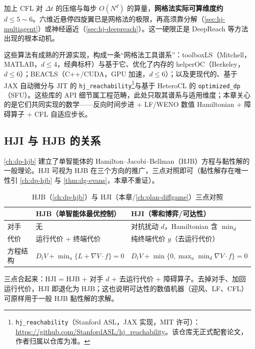\noindent{}加上 CFL 对 $\Delta t$ 的压缩与每步 $O(N^d)$ 的算量，\textbf{网格法实际可算维度约 $d\le5\sim6$}。六维近悬停四旋翼已是网格法的极限，再高须靠分解（\cref{sec:hj-multiagent}）或神经逼近（\cref{sec:hj-deepreach}）。这一硬限正是 DeepReach 等方法出现的根本动机。

这些算法有成熟的开源实现，构成一条“网格法工具谱系”：toolboxLS（Mitchell，MATLAB，$d\le4$，经典标杆）与基于它、优化了内存的 helperOC（Berkeley，$d\le6$）；BEACLS（C++/CUDA，GPU 加速，$d\le6$）；以及更现代的、基于 JAX 自动微分与 JIT 的 \texttt{hj\_reachability}\footnote{\texttt{hj\_reachability}（Stanford ASL，JAX 实现，MIT 许可）：\url{https://github.com/StanfordASL/hj_reachability}。该仓库无正式配套论文，作者归属以仓库为准。}与基于 HeteroCL 的 \texttt{optimized\_dp}（SFU）。这些库的 API 细节属工程范畴，此处只取其谱系与适用维度；本章关心的是它们共同实现的数学——反向时间步进 + LF/WENO 数值 Hamiltonian + 障碍算子 + CFL 自适应步长。

\subsection{HJI 与 HJB 的关系}
\label{sec:hj-vs-hjb}

\cref{ch:dp-hjb} 建立了单智能体的 Hamilton--Jacobi--Bellman（HJB）方程与黏性解的一般理论。HJI 可视为 HJB 在三个方向的推广，三点对照即可（黏性解存在唯一性引 \cref{ch:dp-hjb} 与 \cref{thm:dg-evans}，本章不重证）。

\begin{table}[H]\centering\small
\caption{HJB（\cref{ch:dp-hjb}）与 HJI（本章/\cref{ch:plan-diffgame}）三点对照}
\label{tab:hj-hjb-hji}
\begin{tabular}{lll}
\toprule
 & HJB（单智能体最优控制） & HJI（零和博弈/可达性） \\
\midrule
对手 & 无 & 对抗扰动 $d$，Hamiltonian 含 $\min_d$ \\
代价 & 运行代价 + 终端代价 & 纯终端代价 $g$（去运行代价） \\
方程结构 & $D_tV+\min_u\{L+\nabla V\cdot f\}=0$ & $D_tV+\min\{0,\max_u\min_d\nabla V\cdot f\}=0$ \\
\bottomrule
\end{tabular}
\end{table}

\noindent{}三点合起来：HJI = HJB + 对手 $d$ + 去运行代价 + 障碍算子。去掉对手、加回运行代价，HJI 即退化为 HJB；这也说明可达性的数值机器（迎风、LF、CFL）可原样用于一般 HJB 黏性解的求解。


